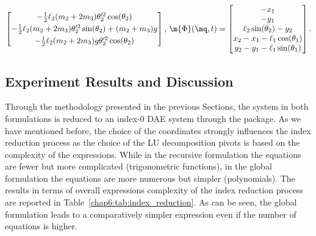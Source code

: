 \begin{subequations}
\begin{equation*}
\begin{bmatrix}
            -\frac{1}{2} \ell_2 (m_2 + 2 m_3) \theta_2^{\prime 2} \cos(\theta_2) \\[1mm]
            -\frac{1}{2} \ell_2 (m_2 + 2 m_3) \theta_2^{\prime 2} \sin(\theta_2) + (m_2 + m_3) g \\[1mm]
            -\frac{1}{2} \ell_2 (m_2 + 2 m_3) g \theta_2^{\prime 2} \cos(\theta_2)
        \end{bmatrix}  \text{,}
        ~
        \m{\Phi}(\mq, t) = \begin{bmatrix}
            -x_1 \\
            -y_1 \\
            \ell_2 \sin(\theta_2) - y_2 \\
            x_2 - x_1 - \ell_1 \cos(\theta_1)  \\
            y_2 - y_1 - \ell_1 \sin(\theta_1)
        \end{bmatrix}  \text{.}
  \end{equation*}
\end{subequations}

\subsection{Experiment Results and Discussion}

Through the methodology presented in the previous Sections, the system in both formulations is reduced to an index-$0$ \ac{DAE} system through the \Indigo{} \Maple{} package. As we have mentioned before, the choice of the coordinates strongly influences the index reduction process as the choice of the LU decomposition pivots is based on the complexity of the expressions. While in the recursive formulation the equations are fewer but more complicated (trigonometric functions), in the global formulation the equations are more numerous but simpler (polynomials). The results in terms of overall expressions complexity of the index reduction process are reported in Table~\ref{chap6:tab:index_reduction}. As can be seen, the global formulation leads to a comparatively simpler expression even if the number of equations is higher.

